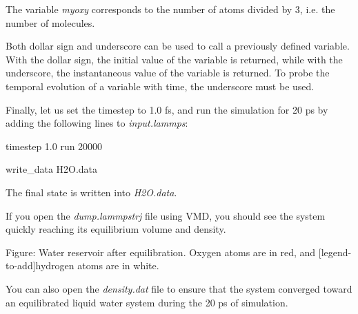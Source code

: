 
\noindent The variable \textit{myoxy} corresponds to the number of atoms
divided by 3, i.e. the number of molecules.

\begin{tcolorbox}[colback=mylightblue!5!white,colframe=mylightblue!75!black,title=On calling variables in LAMMPS]

\vspace{0.25cm} \noindent Both dollar sign and underscore can be used to call a previously defined
variable. With the dollar sign, the initial value of the variable is returned,
while with the underscore, the instantaneous value of the variable is returned. 
To probe the temporal evolution of a variable with time,
the underscore must be used.
\end{tcolorbox}

\noindent Finally, let us set the timestep to 1.0 fs,
and run the simulation for 20 ps by adding the
following lines to \textit{input.lammps}:

\begin{lcverbatim}
timestep 1.0
run 20000

write_data H2O.data
\end{lcverbatim}

\noindent The final state is written into \textit{H2O.data}.

\vspace{0.25cm} \noindent If you open the \textit{dump.lammpstrj} file using VMD, you should
see the system quickly reaching its equilibrium volume and density.

\vspace{0.25cm} Figure: Water reservoir after equilibration. Oxygen atoms are in red, and
[legend-to-add]hydrogen atoms are in white.

\vspace{0.25cm} \noindent You can also open the \textit{density.dat} file to ensure that the system converged
toward an equilibrated liquid water system during the 20 ps of simulation.

